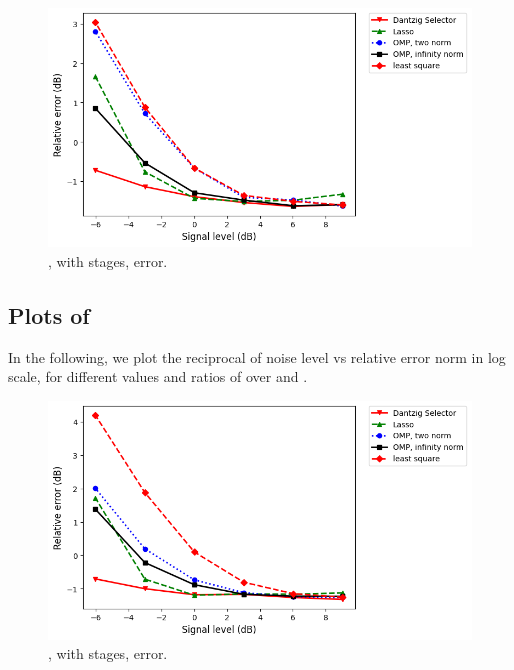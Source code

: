 \begin {figure} [H]
\includegraphics [width = \textwidth] {error-medium-wide-four.png}
\caption {, with  stages, error.}
\end {figure}


\subsection {Plots of }

In the following, we plot the reciprocal of noise level vs relative error norm in log scale, for different values and ratios of  over  and .

\begin {figure} [H]
\includegraphics [width = \textwidth] {error-big-square-two.png}
\caption {, with  stages, error.}
\end {figure}

